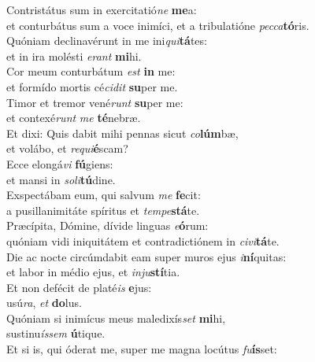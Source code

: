 \evenverse Contristátus sum in exercitatió\textit{ne} \textbf{me}a:~\*\\
\evenverse et conturbátus sum a voce inimíci, et a tribulatióne \textit{pec}\textit{ca}\textbf{tó}ris.\\
\oddverse Quóniam declinavérunt in me ini\textit{qui}\textbf{tá}tes:~\*\\
\oddverse et in ira molésti \textit{e}\textit{rant} \textbf{mi}hi.\\
\evenverse Cor meum conturbátum \textit{est} \textbf{in} me:~\*\\
\evenverse et formído mortis cé\textit{ci}\textit{dit} \textbf{su}per me.\\
\oddverse Timor et tremor vené\textit{runt} \textbf{su}per me:~\*\\
\oddverse et contexé\textit{runt} \textit{me} \textbf{té}nebræ.\\
\evenverse Et dixi: Quis dabit mihi pennas sicut \textit{co}\textbf{lúm}bæ,~\*\\
\evenverse et volábo, et \textit{re}\textit{qui}\textbf{é}scam?\\
\oddverse Ecce elongá\textit{vi} \textbf{fú}giens:~\*\\
\oddverse et mansi in \textit{so}\textit{li}\textbf{tú}dine.\\
\evenverse Exspectábam eum, qui salvum \textit{me} \textbf{fe}cit:~\*\\
\evenverse a pusillanimitáte spíritus et \textit{tem}\textit{pe}\textbf{stá}te.\\
\oddverse Præcípita, Dómine, dívide linguas \textit{e}\textbf{ó}rum:~\*\\
\oddverse quóniam vidi iniquitátem et contradictiónem in \textit{ci}\textit{vi}\textbf{tá}te.\\
\evenverse Die ac nocte circúmdabit eam super muros ejus \textit{i}\textbf{ní}quitas:~\*\\
\evenverse et labor in médio ejus, et \textit{in}\textit{ju}\textbf{stí}tia.\\
\oddverse Et non defécit de platé\textit{is} \textbf{e}jus:~\*\\
\oddverse usú\textit{ra}, \textit{et} \textbf{do}lus.\\
\evenverse Quóniam si inimícus meus maledixís\textit{set} \textbf{mi}hi,~\*\\
\evenverse sustinu\textit{ís}\textit{sem} \textbf{ú}tique.\\
\oddverse Et si is, qui óderat me, super me magna locútus \textit{fu}\textbf{ís}set:~\*\\
